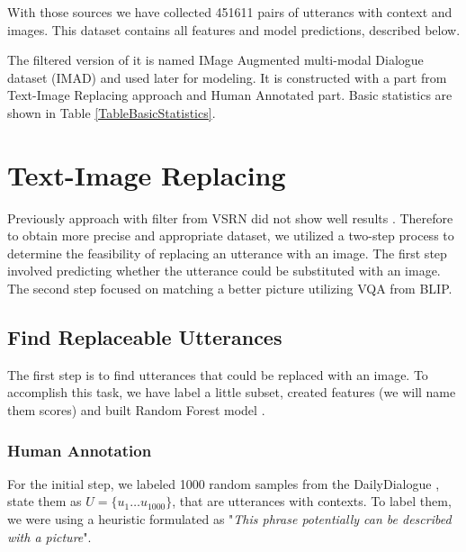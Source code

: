\documentclass[11pt]{article}
\begin{document}
\smallskip

With those sources we have collected 451611 pairs of utterancs with context and images. This dataset contains all features and model predictions, described below. 

\smallskip

The filtered version of it is named IMage Augmented multi-modal Dialogue dataset (IMAD) and used later for modeling. It is constructed with a part from Text-Image Replacing approach and Human Annotated part. Basic statistics are shown in Table \ref{TableBasicStatistics}.


\section{Text-Image Replacing}

Previously approach with filter from VSRN did not show well results \cite{Lee-2021}. 
Therefore to obtain more precise and appropriate dataset, we utilized a two-step process to determine the feasibility of replacing an utterance with an image. The first step involved predicting whether the utterance could be substituted with an image. The second step focused on matching a better picture utilizing VQA from BLIP.







\subsection{Find Replaceable Utterances}

The first step is to find utterances that could be replaced with an image. To accomplish this task, we have label a little subset, created features (we will name them scores) and built Random Forest model \cite{scikit-learn}.

\subsubsection{Human Annotation}

For the initial step, we labeled 1000 random samples from the DailyDialogue \cite{Li-Su-2017}, state them as $U = \{u_1 \dots u_{1000}\}$, that are utterances with contexts. To label them, we were using a heuristic formulated as "\textit{This phrase potentially can be described with a picture}".
\end{document}

